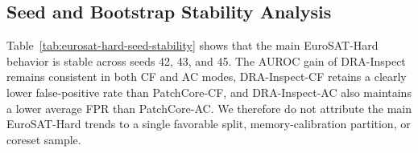 \documentclass[remotesensing,article,submit,pdftex,moreauthors]{Definitions/mdpi}
\begin{document}
\subsection{Seed and Bootstrap Stability Analysis}

\begin{table}[!htbp]
\caption{Seed stability on EuroSAT-Hard over seeds 42, 43, and 45. Values are reported as mean $\pm$ standard deviation over the averaged protocol-degradation results.}
\label{tab:eurosat-hard-seed-stability}
\centering
\small
\setlength{\tabcolsep}{4pt}
\end{table}

\noindent Table~\ref{tab:eurosat-hard-seed-stability} shows that the main EuroSAT-Hard behavior is stable across seeds 42, 43, and 45. The AUROC gain of DRA-Inspect remains consistent in both CF and AC modes, DRA-Inspect-CF retains a clearly lower false-positive rate than PatchCore-CF, and DRA-Inspect-AC also maintains a lower average FPR than PatchCore-AC. We therefore do not attribute the main EuroSAT-Hard trends to a single favorable split, memory-calibration partition, or coreset sample.
\end{document}

